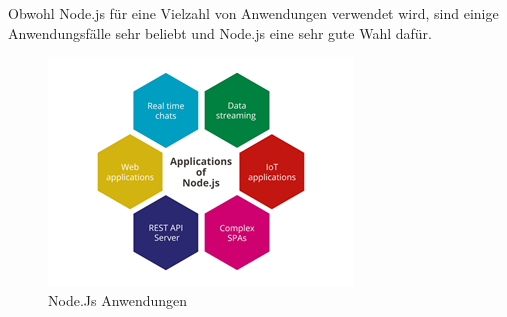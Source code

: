 
Obwohl Node.js für eine Vielzahl von Anwendungen verwendet wird, sind einige Anwendungsfälle sehr beliebt und Node.js eine sehr gute Wahl dafür.

\begin{figure}[H]
    \centering
    \includegraphics{media/NodeJs/NodeJsAnwendungen.png}
    \caption{Node.Js Anwendungen \cite{AnwendungenFoto}}
\end{figure}

